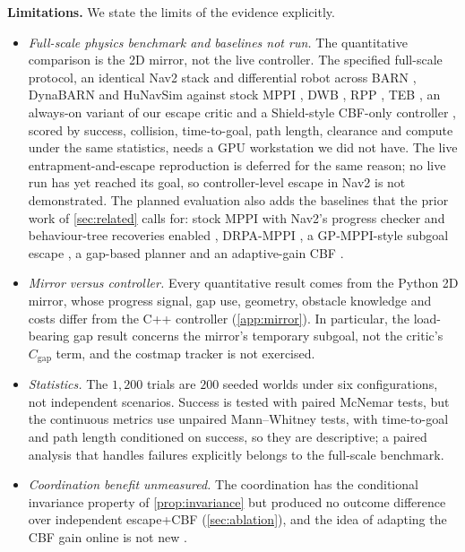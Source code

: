 \noindent\textbf{Limitations.} We state the limits of the evidence explicitly.
\begin{itemize}
    \item \emph{Full-scale physics benchmark and baselines not run.} The quantitative comparison is the 2D mirror, not the live controller. The specified full-scale protocol, an identical Nav2 stack and differential robot across BARN \citep{barn,barn_challenge}, DynaBARN \citep{dynabarn} and HuNavSim \citep{hunavsim} against stock MPPI \citep{nav2,mppi_orig}, DWB \citep{dwa}, RPP \citep{rpp}, TEB \citep{teb}, an always-on variant of our escape critic and a Shield-style CBF-only controller \citep{shield_mppi}, scored by success, collision, time-to-goal, path length, clearance and compute under the same statistics, needs a GPU workstation we did not have. The live entrapment-and-escape reproduction is deferred for the same reason; no live run has yet reached its goal, so controller-level escape in Nav2 is not demonstrated. The planned evaluation also adds the baselines that the prior work of \cref{sec:related} calls for: stock MPPI with Nav2's progress checker and behaviour-tree recoveries enabled \citep{nav2_progress,nav2_bt}, DRPA-MPPI \citep{drpa_mppi}, a GP-MPPI-style subgoal escape \citep{gp_mppi}, a gap-based planner \citep{safer_gap} and an adaptive-gain CBF \citep{kim_adaptive_cbf}.
    \item \emph{Mirror versus controller.} Every quantitative result comes from the Python 2D mirror, whose progress signal, gap use, geometry, obstacle knowledge and costs differ from the C++ controller (\cref{app:mirror}). In particular, the load-bearing gap result concerns the mirror's temporary subgoal, not the critic's $C_{\mathrm{gap}}$ term, and the costmap tracker is not exercised.
    \item \emph{Statistics.} The $1{,}200$ trials are $200$ seeded worlds under six configurations, not independent scenarios. Success is tested with paired McNemar tests, but the continuous metrics use unpaired Mann--Whitney tests, with time-to-goal and path length conditioned on success, so they are descriptive; a paired analysis that handles failures explicitly belongs to the full-scale benchmark.
    \item \emph{Coordination benefit unmeasured.} The coordination has the conditional invariance property of \cref{prop:invariance} but produced no outcome difference over independent escape+CBF (\cref{sec:ablation}), and the idea of adapting the CBF gain online is not new \citep{kim_adaptive_cbf,br_mppi,rt_cbf}.

\end{itemize}
